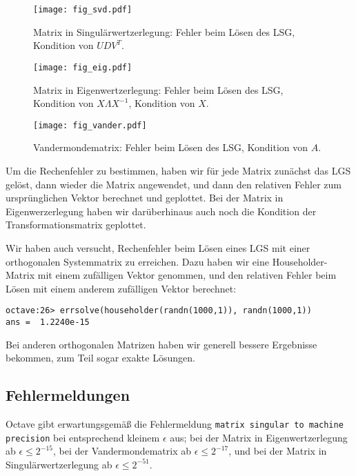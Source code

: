 \documentclass{scrartcl}
\begin{document}
\begin{figure}[!htb]
\centering
\texttt{[image: fig\_svd.pdf]}
\caption{Matrix in Singulärwertzerlegung: Fehler beim Lösen des LSG, Kondition von \(UDV^T\). }
\label{fig:svd}
\end{figure}

\begin{figure}[!htb]
\centering
\texttt{[image: fig\_eig.pdf]}
\caption{Matrix in Eigenwertzerlegung: Fehler beim Lösen des LSG, Kondition von \(X \Lambda X^{-1}\), Kondition von \(X\). }
\label{fig:eig}
\end{figure}

\begin{figure}[!htb]
\centering
\texttt{[image: fig\_vander.pdf]}
\caption{Vandermondematrix: Fehler beim Lösen des LSG, Kondition von \(A\). }
\label{fig:vander}
\end{figure}

Um die Rechenfehler zu bestimmen, haben wir für jede Matrix zunächst das LGS
gelöst, dann wieder die Matrix angewendet, und dann den relativen Fehler zum
ursprünglichen Vektor berechnet und geplottet.  Bei der Matrix in
Eigenwerzerlegung haben wir darüberhinaus auch noch die Kondition der
Transformationsmatrix geplottet.

Wir haben auch versucht, Rechenfehler beim Lösen eines LGS mit einer
orthogonalen Systemmatrix zu erreichen.  Dazu haben wir eine Householder-Matrix
mit einem zufälligen Vektor genommen, und den relativen Fehler beim Lösen mit
einem anderem zufälligen Vektor berechnet:

\begin{verbatim}
octave:26> errsolve(householder(randn(1000,1)), randn(1000,1))
ans =  1.2240e-15
\end{verbatim}

Bei anderen orthogonalen Matrizen haben wir generell bessere Ergebnisse
bekommen, zum Teil sogar exakte Lösungen.

\subsection{Fehlermeldungen}

Octave gibt erwartungsgemäß die Fehlermeldung \texttt{matrix singular to
machine precision} bei entsprechend kleinem \(\epsilon\) aus; bei der Matrix in
Eigenwertzerlegung ab \(\epsilon \leq 2^{-15}\), bei der Vandermondematrix ab
\(\epsilon \leq 2^{-17}\), und bei der Matrix in Singulärwertzerlegung ab
\(\epsilon \leq 2^{-51}\).
\end{document}
